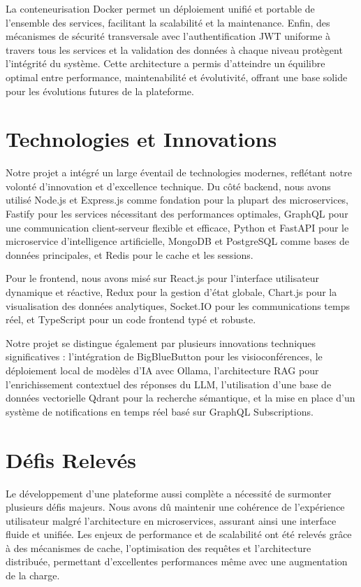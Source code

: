 La conteneurisation Docker permet un déploiement unifié et portable de l'ensemble des services, facilitant la scalabilité et la maintenance. Enfin, des mécanismes de sécurité transversale avec l'authentification JWT uniforme à travers tous les services et la validation des données à chaque niveau protègent l'intégrité du système. Cette architecture a permis d'atteindre un équilibre optimal entre performance, maintenabilité et évolutivité, offrant une base solide pour les évolutions futures de la plateforme.

\section{Technologies et Innovations}
Notre projet a intégré un large éventail de technologies modernes, reflétant notre volonté d'innovation et d'excellence technique. Du côté backend, nous avons utilisé Node.js et Express.js comme fondation pour la plupart des microservices, Fastify pour les services nécessitant des performances optimales, GraphQL pour une communication client-serveur flexible et efficace, Python et FastAPI pour le microservice d'intelligence artificielle, MongoDB et PostgreSQL comme bases de données principales, et Redis pour le cache et les sessions.

Pour le frontend, nous avons misé sur React.js pour l'interface utilisateur dynamique et réactive, Redux pour la gestion d'état globale, Chart.js pour la visualisation des données analytiques, Socket.IO pour les communications temps réel, et TypeScript pour un code frontend typé et robuste.

Notre projet se distingue également par plusieurs innovations techniques significatives : l'intégration de BigBlueButton pour les visioconférences, le déploiement local de modèles d'IA avec Ollama, l'architecture RAG pour l'enrichissement contextuel des réponses du LLM, l'utilisation d'une base de données vectorielle Qdrant pour la recherche sémantique, et la mise en place d'un système de notifications en temps réel basé sur GraphQL Subscriptions.

\section{Défis Relevés}
Le développement d'une plateforme aussi complète a nécessité de surmonter plusieurs défis majeurs. Nous avons dû maintenir une cohérence de l'expérience utilisateur malgré l'architecture en microservices, assurant ainsi une interface fluide et unifiée. Les enjeux de performance et de scalabilité ont été relevés grâce à des mécanismes de cache, l'optimisation des requêtes et l'architecture distribuée, permettant d'excellentes performances même avec une augmentation de la charge.

